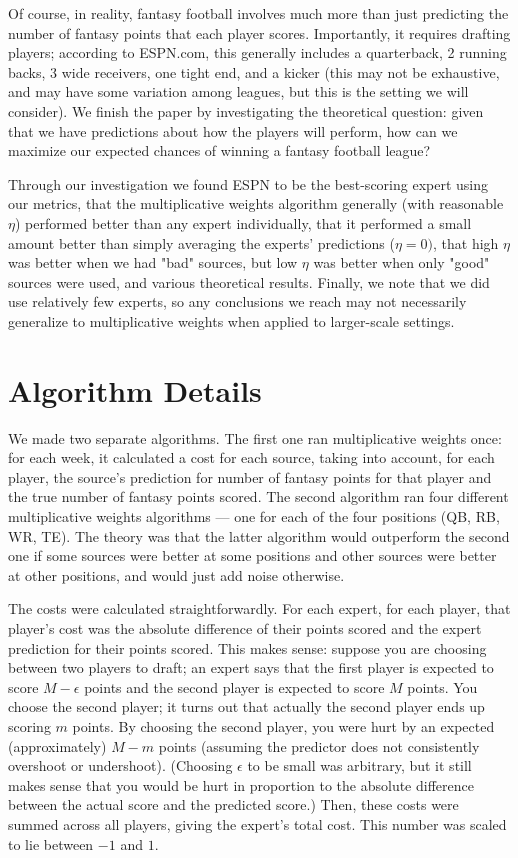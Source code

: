 \documentclass[12pt, final, onecolumn, titlepage]{article}
\theoremstyle{definition}
\begin{document}
Of course, in reality, fantasy football involves much more than just predicting the number of fantasy points that each player scores. Importantly, it requires drafting players; according to ESPN.com, this generally includes a quarterback, 2 running backs, 3 wide receivers, one tight end, and a kicker (this may not be exhaustive, and may have some variation among leagues, but this is the setting we will consider). We finish the paper by investigating the theoretical question: given that we have predictions about how the players will perform, how can we maximize our expected chances of winning a fantasy football league?

Through our investigation we found ESPN to be the  best-scoring expert using our metrics, that the multiplicative weights algorithm generally (with reasonable $\eta$) performed better than any expert individually, that it performed a small amount better than simply averaging the experts' predictions ($\eta = 0)$, that high $\eta$ was better when we had "bad" sources, but low $\eta$ was better when only "good" sources were used, and various theoretical results. Finally, we note that we did use relatively few experts, so any conclusions we reach may not necessarily generalize to multiplicative weights when applied to larger-scale settings.

\section{Algorithm Details}
We made two separate algorithms. The first one ran multiplicative weights once: for each week, it calculated a cost for each source, taking into account, for each player, the source's prediction for number of fantasy points for that player and the true number of fantasy points scored. The second algorithm ran four different multiplicative weights algorithms --- one for each of the four positions (QB, RB, WR, TE). The theory was that the latter algorithm would outperform the second one if some sources were better at some positions and other sources were better at other positions, and would just add noise otherwise.

The costs were calculated straightforwardly. For each expert, for each player, that player's cost was the absolute difference of their points scored and the expert prediction for their points scored. This makes sense: suppose you are choosing between two players to draft; an expert says that the first player is expected to score $M - \epsilon$ points and the second player is expected to score $M$ points. You choose the second player; it turns out that actually the second player ends up scoring $m$ points. By choosing the second player, you were hurt by an expected (approximately) $M - m$ points (assuming the predictor does not consistently overshoot or undershoot). (Choosing $\epsilon$ to be small was arbitrary, but it still makes sense that you would be hurt in proportion to the absolute difference between the actual score and the predicted score.) Then, these costs were summed across all players, giving the expert's total cost. This number was scaled to lie between $-1$ and $1$.
\end{document}
